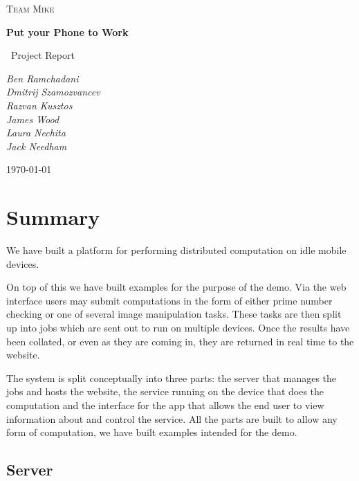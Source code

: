 \documentclass[a4paper,10pt]{article}
\title{}
\author{}
\date{}
\begin{document}
\begin{titlepage}
	\centering
	
	{\scshape\Large Team Mike\par}
	\vspace{4cm}
	{\huge\bfseries Put your Phone to Work\par}
	\vspace{1.5cm}
	{\Large\
	Project Report
	\par}
	\vspace{2cm}
	{\Large\itshape 
	      Ben Ramchadani\\
	      Dmitrij Szamozvancev\\
	      Razvan Kusztos\\
	      James Wood \\
	      Laura Nechita \\
	      Jack Needham
	      \par}
	\vfill

	{\large \today\par}
\end{titlepage}
\maketitle
\tableofcontents
\newpage
\section{Summary}

We have built a platform for performing distributed computation on idle mobile devices.

On top of this we have built examples for the purpose of the demo.
Via the web interface users may submit computations in the form of either prime number checking or one of several image manipulation tasks.
These tasks are then split up into jobs which are sent out to run on multiple devices.
Once the results have been collated, or even as they are coming in, they are returned in real time to the website.

The system is split conceptually into three parts: the server that manages the jobs and hosts the website, the service running on the device that does the computation
and the interface for the app that allows the end user to view information about and control the service.
All the parts are built to allow any form of computation, we have built examples intended for the demo.


\subsection{Server}
\end{document}

